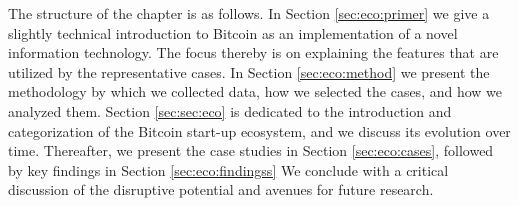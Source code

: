 The structure of the chapter is as follows. In Section \ref{sec:eco:primer} we give a slightly technical 
introduction to Bitcoin as an implementation of a novel information technology. 
The focus thereby is on explaining the features that are utilized by the representative 
cases. In Section \ref{sec:eco:method} we present the methodology by which we collected data, how 
we selected the cases, and how we analyzed them. Section \ref{sec:sec:eco} is dedicated to the 
introduction and categorization of the Bitcoin start-up ecosystem, and we discuss 
its evolution over time. Thereafter, we present the case studies in Section \ref{sec:eco:cases}, 
followed by key findings in Section \ref{sec:eco:findingss} We conclude with a critical discussion of 
the disruptive potential and avenues for future research.




